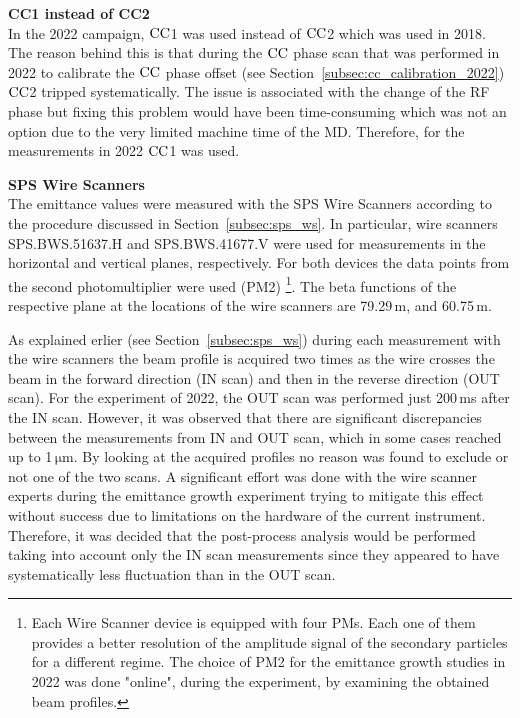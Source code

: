 \textbf{CC1 instead of CC2}\\
In the 2022 campaign, ${\mathrm{CC}}$1 was used instead of ${\mathrm{CC}}$2 which was used in 2018. The reason behind this is that during the ${\mathrm{CC}}$ phase scan that was performed in 2022 to calibrate the ${\mathrm{CC}}$ phase offset (see Section~\ref{subsec:cc_calibration_2022}) ${\mathrm{CC}}$2 tripped systematically. The issue is associated with the change of the RF phase but fixing this problem would have been time-consuming which was not an option due to the very limited machine time of the MD. Therefore, for the measurements in 2022 ${\mathrm{CC}}$1 was used.

\textbf{SPS Wire Scanners}\\
The emittance values were measured with the SPS Wire Scanners according to the procedure discussed in Section~\ref{subsec:sps_ws}. In particular, wire scanners SPS.BWS.51637.H and SPS.BWS.41677.V were used for measurements in the horizontal and vertical planes, respectively. For both devices the data points from the second photomultiplier were used (PM2) \footnote{Each Wire Scanner device is equipped with four PMs. Each one of them provides a better resolution of the amplitude signal of the secondary particles for a different regime. The choice of PM2 for the emittance growth studies in 2022 was done "online", during the experiment, by examining the obtained beam profiles.}. The beta functions of the respective plane at the locations of the wire scanners are 79.29\,m, and  60.75\,m. 

As explained erlier (see Section~\ref{subsec:sps_ws}) during each measurement with the wire scanners the beam profile is acquired two times as the wire crosses the beam in the forward direction (IN scan) and then in the reverse direction (OUT scan). For the experiment of 2022, the OUT scan was performed just 200\,ms after the IN scan. However, it was observed that there are significant discrepancies between the measurements from IN and OUT scan, which in some cases reached up to 1\,$\mathrm{\mu m}$. By looking at the acquired profiles no reason was found to exclude or not one of the two scans. A significant effort was done with the wire scanner experts during the emittance growth experiment trying to mitigate this effect without success due to limitations on the hardware of the current instrument. Therefore, it was decided that the post-process analysis would be performed taking into account only the IN scan measurements since they appeared to have systematically less fluctuation than in the OUT scan.

